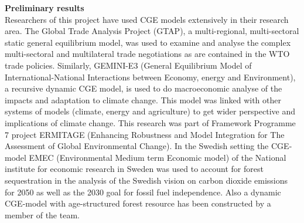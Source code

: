 \textbf{Preliminary results}\\
Researchers of this project have used CGE models extensively in their research area. The Global Trade Analysis Project (GTAP), a multi-regional, multi-sectoral static general equilibrium model, was used to examine and analyse the complex multi-sectoral and multilateral trade negotiations as are contained in the WTO trade policies. Similarly, GEMINI-E3 (General Equilibrium Model of International-National Interactions between Economy, energy and Environment), a recursive dynamic CGE model, is used to do macroeconomic analyse of the impacts and adaptation to climate change. This model was linked with other systems of models (climate, energy and agriculture) to get wider perspective and implications of climate change. This research was part of Framework Programme 7 project ERMITAGE (Enhancing Robustness and Model Integration for The Assessment of Global Environmental Change). In the Swedish setting the CGE-model EMEC (Environmental Medium term Economic model) of the National institute for economic research in Sweden was used to account for forest sequestration in the analysis of the Swedish vision on carbon dioxide emissions for 2050 as well as the 2030 goal for fossil fuel independence. Also a dynamic CGE-model with age-structured forest resource \citep{furtenback2011three} has been constructed by a member of the team.

